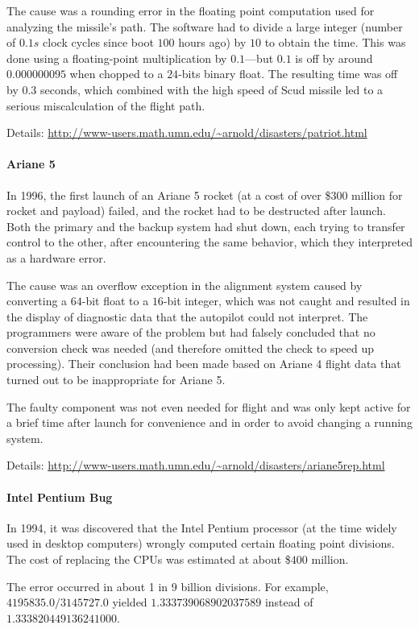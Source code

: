 The cause was a rounding error in the floating point computation used for analyzing the missile's path.
The software had to divide a large integer (number of $0.1s$ clock cycles since boot $100$ hours ago) by $10$ to obtain the time.
This was done using a floating-point multiplication by $0.1$---but $0.1$ is off by around $0.000000095$ when chopped to a $24$-bits binary float.
The resulting time was off by $0.3$ seconds, which combined with the high speed of Scud missile led to a serious miscalculation of the flight path.

Details: \url{http://www-users.math.umn.edu/~arnold/disasters/patriot.html}

\paragraph{Ariane 5}
In 1996, the first launch of an Ariane 5 rocket (at a cost of over \$$300$ million for rocket and payload) failed, and the rocket had to be destructed after launch.
Both the primary and the backup system had shut down, each trying to transfer control to the other, after encountering the same behavior, which they interpreted as a hardware error.

The cause was an overflow exception in the alignment system caused by converting a $64$-bit float to a $16$-bit integer, which was not caught and resulted in the display of diagnostic data that the autopilot could not interpret.
The programmers were aware of the problem but had falsely concluded that no conversion check was needed (and therefore omitted the check to speed up processing).
Their conclusion had been made based on Ariane 4 flight data that turned out to be inappropriate for Ariane 5.

The faulty component was not even needed for flight and was only kept active for a brief time after launch for convenience and in order to avoid changing a running system.

Details: \url{http://www-users.math.umn.edu/~arnold/disasters/ariane5rep.html}

\paragraph{Intel Pentium Bug}
In 1994, it was discovered that the Intel Pentium processor (at the time widely used in desktop computers) wrongly computed certain floating point divisions.
The cost of replacing the CPUs was estimated at about \$$400$ million.

The error occurred in about 1 in 9 billion divisions.
For example, $4195835.0/3145727.0$ yielded $1.333 739 068 902 037 589$ instead of $1.333 820 449 136 241 000$.

